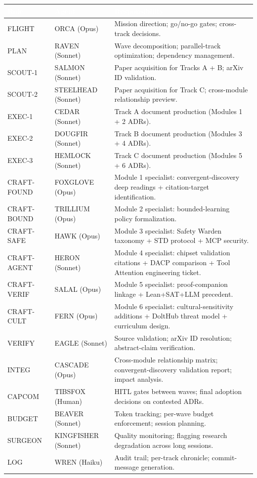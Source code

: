 \documentclass[11pt,letterpaper]{article}
\newcommand{\tableheader}[1]{\textbf{\sffamily\textcolor{white}{#1}}}
\begin{document}
\begin{center}
\begin{tabularx}{\textwidth}{L{2cm}L{2.5cm}X}
\toprule
{}
\tableheader{Role} & \tableheader{Agent} & \tableheader{Responsibility} \\
\midrule
FLIGHT & ORCA (Opus) & Mission direction; go/no-go gates; cross-track decisions. \\
PLAN & RAVEN (Sonnet) & Wave decomposition; parallel-track optimization; dependency management. \\
SCOUT-1 & SALMON (Sonnet) & Paper acquisition for Tracks A + B; arXiv ID validation. \\
SCOUT-2 & STEELHEAD (Sonnet) & Paper acquisition for Track C; cross-module relationship preview. \\
EXEC-1 & CEDAR (Sonnet) & Track A document production (Modules 1 + 2 ADRs). \\
EXEC-2 & DOUGFIR (Sonnet) & Track B document production (Modules 3 + 4 ADRs). \\
EXEC-3 & HEMLOCK (Sonnet) & Track C document production (Modules 5 + 6 ADRs). \\
CRAFT-FOUND & FOXGLOVE (Opus) & Module 1 specialist: convergent-discovery deep readings + citation-target identification. \\
CRAFT-BOUND & TRILLIUM (Opus) & Module 2 specialist: bounded-learning policy formalization. \\
CRAFT-SAFE & HAWK (Opus) & Module 3 specialist: Safety Warden taxonomy + STD protocol + MCP security. \\
CRAFT-AGENT & HERON (Sonnet) & Module 4 specialist: chipset validation citations + DACP comparison + Tool Attention engineering ticket. \\
CRAFT-VERIF & SALAL (Opus) & Module 5 specialist: proof-companion linkage + Lean+SAT+LLM precedent. \\
CRAFT-CULT & FERN (Opus) & Module 6 specialist: cultural-sensitivity additions + DoltHub threat model + curriculum design. \\
VERIFY & EAGLE (Sonnet) & Source validation; arXiv ID resolution; abstract-claim verification. \\
INTEG & CASCADE (Opus) & Cross-module relationship matrix; convergent-discovery validation report; impact analysis. \\
CAPCOM & TIBSFOX (Human) & HITL gates between waves; final adoption decisions on contested ADRs. \\
BUDGET & BEAVER (Sonnet) & Token tracking; per-wave budget enforcement; session planning. \\
SURGEON & KINGFISHER (Sonnet) & Quality monitoring; flagging research degradation across long sessions. \\
LOG & WREN (Haiku) & Audit trail; per-track chronicle; commit-message generation. \\
\bottomrule
\end{tabularx}
\end{center}
\end{document}
